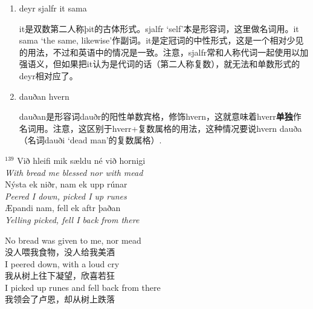 \begin{grammar*}{}
    \begin{enumerate}[leftmargin=*]

        \item deyr sjalfr it sama

              it是双数第二人称þit的古体形式。sjalfr `self'本是形容词，这里做名词用。it sama
              `the same, likewise'作副词。it是定冠词的中性形式，这是一个相对少见的用法，不过和英语中的情况是一致。注意，sjalfr常和人称代词一起使用以加强语义，但如果把it认为是代词的话（第二人称复数），就无法和单数形式的deyr相对应了。

        \item dauðan hvern

              dauðan是形容词dauðr的阳性单数宾格，修饰hvern，这就意味着hverr\textbf{单独}作名词用。注意，这区别于hverr+复数属格的用法，这种情况要说hvern dauða（名词dauði `dead man'的复数属格）.

    \end{enumerate}
\end{grammar*}
\medskip %
\begin{paracol}{2}
    \noindent
    $^{139}$ Við hleifi mik sældu né við hornigi\\
    \textit{With bread me blessed nor with mead}\\
    Nýsta ek niðr, nam ek upp rúnar\\
    \textit{Peered I down, picked I up runes}\\
    \MakeUppercase æpandi nam, fell ek aftr þaðan\\
    \textit{Yelling picked, fell I back from there}\\
    \switchcolumn

    \noindent
    No bread was given to me, nor mead\\
    没人喂我食物，没人给我美酒\\
    I peered down, with a loud cry\\
    我从树上往下凝望，欣喜若狂\\
    I picked up runes and fell back from there\\
    我领会了卢恩，却从树上跌落\\

\end{paracol}

